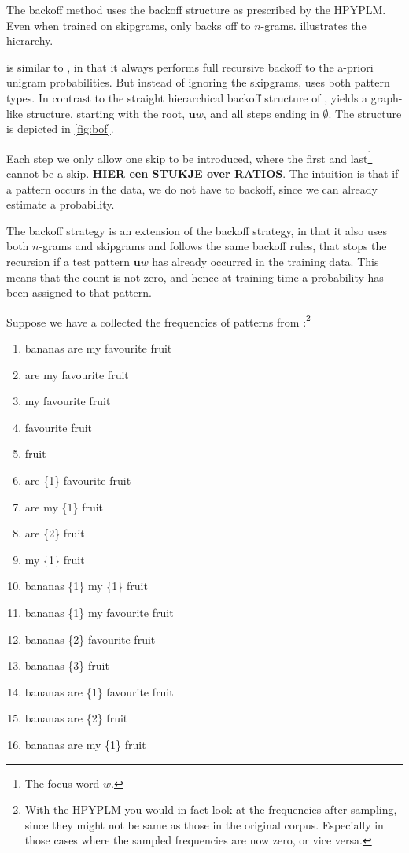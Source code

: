 The \BON backoff method uses the backoff structure as prescribed by the HPYPLM. Even when trained on skipgrams, \BON only backs off to $n$-grams.  illustrates the \BON hierarchy.



\BOF is similar to \BON, in that it always performs full recursive backoff to the a-priori unigram probabilities. But instead of ignoring the skipgrams, \BOF uses both pattern types. In contrast to the straight hierarchical backoff structure of \BON, \BOF yields a graph-like structure, starting with the root, $\mathbf{u}w$, and all steps ending in $\emptyset$. The structure is depicted in \cref{fig:bof}.



Each step we only allow one skip to be introduced, where the first and last\footnote{The focus word $w$.} cannot be a skip. \textbf{HIER een STUKJE over RATIOS}. The intuition is that if a pattern occurs in the data, we do not have to backoff, since we can already estimate a probability.

The \BOL backoff strategy is an extension of the \BOF backoff strategy, in that it also uses both $n$-grams and skipgrams and follows the same backoff rules, that stops the recursion if a test pattern $\mathbf{u}w$ has already occurred in the training data. This means that the count is not zero, and hence at training time a probability has been assigned to that pattern.

Suppose we have a collected the frequencies of patterns from \obw:\footnote{With the HPYPLM you would in fact look at the frequencies after sampling, since they might not be same as those in the original corpus. Especially in those cases where the sampled frequencies are now zero, or vice versa.}
\begin{multicols}{2}\begin{enumerate}
	\item[0] bananas are my favourite fruit
	\item[1] are my favourite fruit
	\item[2] my favourite fruit 
	\item[7] favourite fruit
	\item[15391] fruit
	\item[1] are \{1\} favourite fruit
	\item[1] are my \{1\} fruit
	\item[90] are \{2\} fruit
	\item[13] my \{1\} fruit
	\item[0] bananas \{1\} my \{1\} fruit
	\item[0] bananas \{1\} my favourite fruit
	\item[0] bananas \{2\} favourite fruit
	\item[4] bananas \{3\} fruit
	\item[0] bananas are \{1\} favourite fruit
	\item[0] bananas are \{2\} fruit
	\item[0] bananas are my \{1\} fruit
\end{enumerate}\label{enum:minicorpus}\end{multicols}


